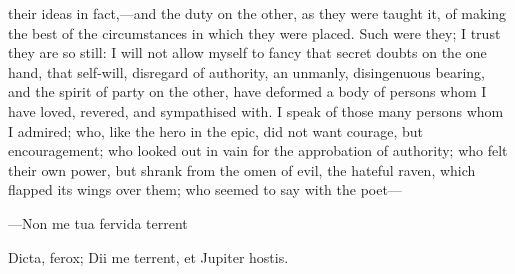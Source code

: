 their ideas in fact,—and the duty on the other, as they were taught
it, of making the best of the circumstances in which they were placed.
Such were they; I trust they are so still: I will not allow myself to
fancy that secret doubts on the one hand, that self-will, disregard of
authority, an unmanly, disingenuous bearing, and the spirit of party
on the other, have deformed a body of persons whom I have loved, revered, and sympathised with. I speak of those many persons whom I
admired; who, like the hero in the epic, did not want courage, but
encouragement; who looked out in vain for the approbation of
authority; who felt their own power, but shrank from the omen of evil,
the hateful raven, which flapped its wings over them; who seemed to
say with the poet—

—Non me tua fervida terrent

Dicta, ferox; Dii me terrent, et Jupiter hostis.

